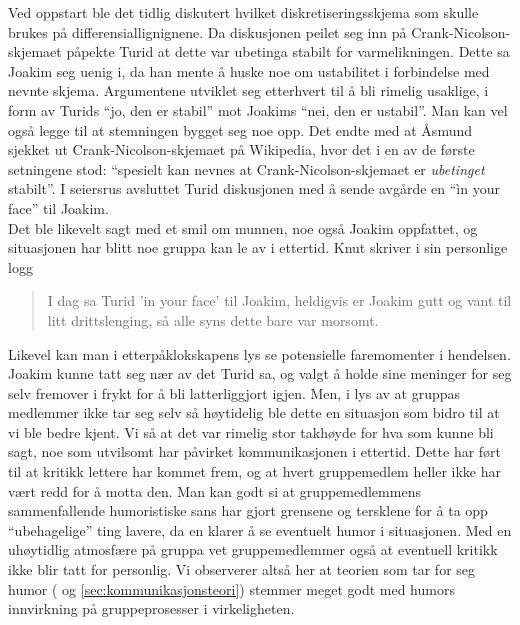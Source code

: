 Ved oppstart ble det tidlig diskutert hvilket diskretiseringsskjema som skulle
brukes på differensiallignignene. Da diskusjonen peilet seg inn på
Crank-Nicolson-skjemaet påpekte Turid at dette var ubetinga stabilt for varmelikningen. Dette
sa Joakim seg uenig i, da han mente å huske noe om ustabilitet i forbindelse med
nevnte skjema. Argumentene utviklet seg etterhvert til å bli rimelig usaklige, i
form av Turids ``jo, den er stabil'' mot Joakims ``nei, den er ustabil''. Man
kan vel også legge til at stemningen bygget seg noe opp. Det endte med at Åsmund
sjekket ut Crank-Nicolson-skjemaet på Wikipedia, hvor det i en av de første
setningene stod: ``spesielt kan nevnes at Crank-Nicolson-skjemaet er
\emph{ubetinget} stabilt''. I seiersrus avsluttet Turid diskusjonen med å sende
avgårde en ``ìn your face'' til Joakim.\\

Det ble likevelt sagt med et smil om munnen, noe også Joakim oppfattet, og
situasjonen har blitt noe gruppa kan le av i ettertid. 
Knut skriver i sin personlige
logg 
\begin{quote}
I dag sa Turid 'in your face' til Joakim, heldigvis er Joakim gutt og
vant til litt drittslenging, så alle syns dette bare var morsomt.
\end{quote}
Likevel kan man i etterpåklokskapens lys se potensielle faremomenter
i hendelsen. Joakim kunne tatt seg nær av det Turid sa, og valgt å holde sine
meninger for seg selv fremover i frykt for å bli latterliggjort igjen. Men, i
lys av at gruppas medlemmer ikke tar seg selv så høytidelig ble dette en
situasjon som bidro til at vi ble bedre kjent. Vi så at det var
rimelig stor takhøyde for hva som kunne bli sagt, noe som utvilsomt har påvirket
kommunikasjonen i ettertid. Dette har ført til at kritikk lettere
har kommet frem, og at hvert gruppemedlem heller ikke har vært redd for å motta
den. Man kan godt si at gruppemedlemmens sammenfallende humoristiske sans har
gjort grensene og tersklene for å ta opp ``ubehagelige'' ting lavere, da en klarer å 
se eventuelt humor i situasjonen. Med en uhøytidlig atmosfære på gruppa vet gruppemedlemmer
også at eventuell kritikk ikke blir tatt for personlig. Vi observerer altså her at teorien 
som tar for seg humor (\cite{jj-humor} og \cref{sec:kommunikasjonsteori}) stemmer 
meget godt med humors innvirkning på gruppeprosesser i virkeligheten.\\



